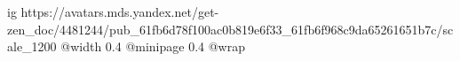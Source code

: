  
 
 
 
 

\ifcmt
  ig https://avatars.mds.yandex.net/get-zen_doc/4481244/pub_61fb6d78f100ac0b819e6f33_61fb6f968c9da65261651b7c/scale_1200
  @width 0.4
  @minipage 0.4
  @wrap \parpic[r]
\fi
